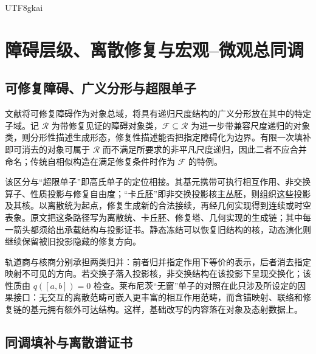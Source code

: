\documentclass[11pt,a4paper]{article}
\theoremstyle{plain}
\theoremstyle{definition}
\theoremstyle{remark}
\begin{document}
\begin{CJK*}{UTF8}{gkai}
\section{障碍层级、离散修复与宏观--微观总同调}
\label{ss:repair}

\subsection{可修复障碍、广义分形与超限单子}

文献\cite{S18}将可修复障碍作为对象总域，将具有递归尺度结构的广义分形放在其中的特定子域。记 $\mathcal R$ 为带修复见证的障碍对象类，$\mathcal F\subseteq\mathcal R$ 为进一步带兼容尺度递归的对象类，则分形性描述生成形态，修复性描述能否把指定障碍化为边界。有限一次填补即可消去的对象可属于 $\mathcal R$ 而不满足所要求的非平凡尺度递归，因此二者不应合并命名；传统自相似构造在满足修复条件时作为 $\mathcal F$ 的特例。

该区分与“超限单子”即高氏单子的定位相接。其基元携带可执行相互作用、非交换算子、性质投影与修复自由度；“卡丘胚”即非交换投影核主丛胚，则组织这些投影及其核。以离散统为起点，修复生成新的合法接续，再经几何实现得到连续或时空表象。原文把这条路径写为离散统、卡丘胚、修复塔、几何实现的生成链；其中每一箭头都须给出承载结构与投影证书。静态冻结可以恢复旧结构的核，动态演化则继续保留被旧投影隐藏的修复方向。

轨道商与核商分别承担两类归并：前者归并指定作用下等价的表示，后者消去指定映射不可见的方向。若交换子落入投影核，非交换结构在该投影下呈现交换化；该性质由 $q([a,b])=0$ 检查。莱布尼茨“无窗”单子的对照在此只涉及所设定的因果接口：无交互的离散范畴可嵌入更丰富的相互作用范畴，而含锚映射、联络和修复链的基元拥有额外可达结构。这样，基础改写的内容落在对象及态射数据上。

\subsection{同调填补与离散谱证书}


\end{CJK*}
\end{document}
